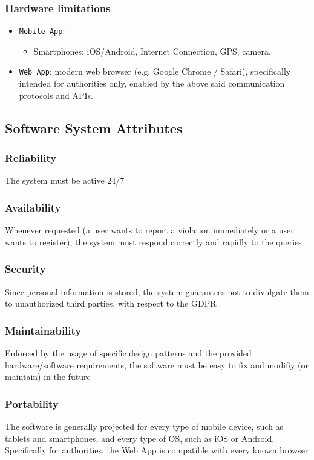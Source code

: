 \documentclass[12pt,a4paper]{article}
\begin{document}
\subsubsection{Hardware limitations}
	\begin{itemize}
			\item \texttt{Mobile App}: 
				\begin{itemize}
					\item Smartphones: iOS/Android, Internet Connection, GPS, camera.
				\end{itemize}
			\item \texttt{Web App}: modern web browser (e.g. Google Chrome / Safari), specifically intended for authorities only, enabled by the above said communication protocols and APIs.
		\end{itemize}
\subsection{Software System Attributes} 
\subsubsection{Reliability}
The system must be active 24/7
\subsubsection{Availability}
Whenever requested (a user wants to report a violation immediately or a user wants to register), the system must respond correctly and rapidly to the queries
\subsubsection{Security}
Since personal information is stored, the system guarantees not to divulgate them to unauthorized third parties, with respect to the GDPR
\subsubsection{Maintainability}
Enforced by the usage of specific design patterns and the provided hardware/software requirements, the software must be easy to fix and modifiy (or maintain) in the future
\subsubsection{Portability}
The software is generally projected for every type of mobile device, such as tablets and smartphones, and every type of OS, such as iOS or Android. Specifically for authorities, the Web App is compatible with every known browser
\\\\
\end{document}
